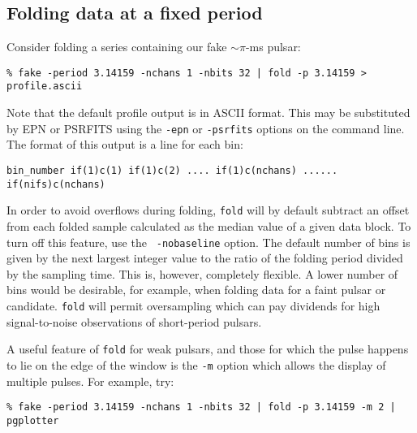 \documentclass[11pt]{article}
\begin{document}
\subsection*{Folding data at a fixed period} Consider folding a series containing
our fake $\sim\pi$-ms pulsar:
\begin{verbatim}
% fake -period 3.14159 -nchans 1 -nbits 32 | fold -p 3.14159 > profile.ascii
\end{verbatim}
Note that the default profile output is in ASCII format. 
This may be substituted by EPN or PSRFITS using the {\tt -epn} or
{\tt -psrfits} options on the command line. The
format of this output is a line for each bin:
\begin{verbatim}
bin_number if(1)c(1) if(1)c(2) .... if(1)c(nchans) ...... if(nifs)c(nchans)
\end{verbatim}
In order to avoid overflows during folding, {\tt fold} will by default
subtract an offset from each folded sample calculated as the median
value of a given data block. To turn off this feature, use the {\tt
-nobaseline} option.  The default number of bins is given by the next
largest integer value to the ratio of the folding period divided by
the sampling time. This is, however, completely flexible. A lower
number of bins would be desirable, for example, when folding data for
a faint pulsar or candidate.  {\tt fold} will permit oversampling
which can pay dividends for high signal-to-noise observations of
short-period pulsars.

A useful feature of {\tt fold} for weak pulsars, and those for which the 
pulse happens to lie on the edge of the window is the {\tt -m} option
which allows the display of multiple pulses. For example, try:
\begin{verbatim}
% fake -period 3.14159 -nchans 1 -nbits 32 | fold -p 3.14159 -m 2 | pgplotter
\end{verbatim}
\end{document}
